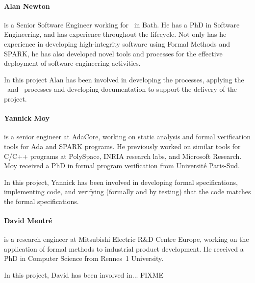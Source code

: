 \paragraph{Alan Newton}\label{AlanNewton} is a Senior Software Engineer
working for \altran\ in Bath. He has a PhD in Software Engineering,
and has experience throughout the lifecycle. Not only has he
experience in developing high-integrity software using Formal Methods
and SPARK, he has also developed novel tools and processes for the
effective deployment of software engineering activities.

In this project Alan has been involved in developing the processes,
applying the \reveal\ and \informed\ processes and developing
documentation to support the delivery of the project.

\paragraph{Yannick Moy}\label{YannickMoy}
is a senior engineer at AdaCore, working on static
analysis and formal verification tools for Ada and SPARK programs. He
previously worked on similar tools for C/C++ programs at PolySpace,
INRIA research labs, and Microsoft Research. Moy received a PhD in
formal program verification from Universit\'e Paris-Sud.

In this project, Yannick has been involved in developing formal
specifications, implementing code, and verifying (formally and by testing)
that the code matches the formal specifications.

\paragraph{David Mentr\' e}\label{DavidMentre} is a research engineer at
Mitsubishi Electric R\&D Centre Europe, working on the application of
formal methods to industrial product development. He received a PhD in
Computer Science from Rennes~1 University.

In this project, David has been involved in... FIXME
